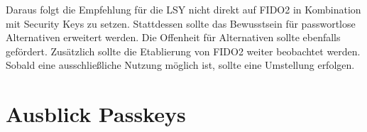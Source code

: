 Daraus folgt die Empfehlung für die \ac{LSY} nicht direkt auf FIDO2 in Kombination mit Security Keys zu setzen. Stattdessen sollte das Bewusstsein für passwortlose Alternativen erweitert werden. Die Offenheit für Alternativen sollte ebenfalls gefördert. Zusätzlich sollte die Etablierung von FIDO2 weiter beobachtet werden. Sobald eine ausschließliche Nutzung möglich ist, sollte eine Umstellung erfolgen.

\chapter{Ausblick Passkeys}